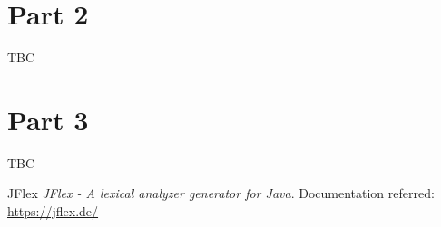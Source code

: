 \documentclass{article}
\begin{document}
	\newpage

	\section{Part 2}
	TBC
	\newpage

	\section{Part 3}
	TBC



	\begin{thebibliography}{9}

	JFlex \textit{JFlex - A lexical analyzer generator for Java}.
	Documentation referred: \url{https://jflex.de/}

	\end{thebibliography}

	
\end{document}
